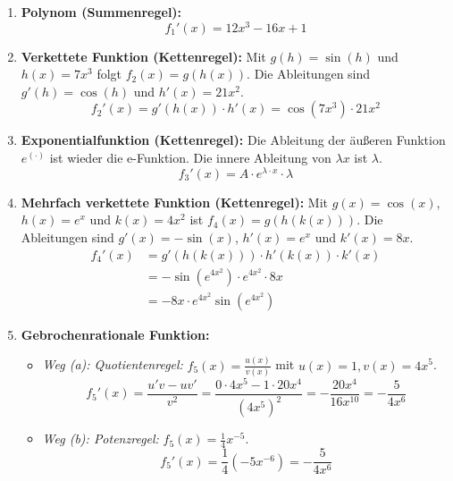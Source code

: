 \documentclass[ngerman]{scrreprt}
\newenvironment{loesungbox}[1]
  {\needspace{5\baselineskip}\begin{loesungboxstyle}[frametitle={#1}]}
  {\end{loesungboxstyle}}
\begin{document}
\begin{loesungbox}{Lösung zu \Cref{aufg:ableitungen}}
\begin{enumerate}
    \item \textbf{Polynom (Summenregel):}
    \begin{equation}
        f_{1}'(x)=12x^{3}-16x+1
    \end{equation}
    
    \item \textbf{Verkettete Funktion (Kettenregel):}
    Mit $g(h) = \sin(h)$ und $h(x)=7x^{3}$ folgt $f_2(x) = g(h(x))$. Die Ableitungen sind $g'(h) = \cos(h)$ und $h'(x) = 21x^2$.
    \begin{equation}
        f_{2}'(x) = g'(h(x)) \cdot h'(x) = \cos(7x^{3}) \cdot 21x^{2}
    \end{equation}

    \item \textbf{Exponentialfunktion (Kettenregel):}
    Die Ableitung der äußeren Funktion $e^{(\cdot)}$ ist wieder die e-Funktion. Die innere Ableitung von $\lambda x$ ist $\lambda$.
    \begin{equation}
        f_{3}'(x)=A\cdot e^{\lambda\cdot x}\cdot \lambda
    \end{equation}
    
    \item \textbf{Mehrfach verkettete Funktion (Kettenregel):}
    Mit $g(x)=\cos(x)$, $h(x)=e^{x}$ und $k(x)=4x^{2}$ ist $f_4(x)=g(h(k(x)))$. Die Ableitungen sind $g'(x)=-\sin(x)$, $h'(x)=e^{x}$ und $k'(x)=8x$.
    \begin{align}
        f_{4}'(x) &= g'(h(k(x)))\cdot h'(k(x))\cdot k'(x) \nonumber \\
        &= -\sin(e^{4x^{2}})\cdot e^{4x^{2}}\cdot 8x \nonumber \\
        &= -8x\cdot e^{4x^{2}} \sin(e^{4x^{2}})
    \end{align}
    
    \item \textbf{Gebrochenrationale Funktion:}
    \begin{itemize}
        \item \textit{Weg (a): Quotientenregel:} $f_5(x) = \frac{u(x)}{v(x)}$ mit $u(x)=1, v(x)=4x^5$.
        \begin{equation}
             f_{5}'(x)=\frac{u'v - uv'}{v^2} = \frac{0\cdot4x^{5}-1\cdot20x^{4}}{{(4x^{5})}^{2}}=-\frac{20x^{4}}{16x^{10}}=-\frac{5}{4x^{6}}
        \end{equation}
        \item \textit{Weg (b): Potenzregel:} $f_5(x) = \frac{1}{4}x^{-5}$.
        \begin{equation}
            f_{5}'(x)=\frac{1}{4}(-5x^{-6})=-\frac{5}{4x^{6}}
        \end{equation}
    \end{itemize}
    

\end{enumerate}
\end{loesungbox}
\end{document}
